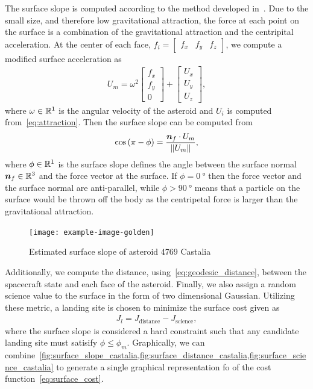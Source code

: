 The surface slope is computed according to the method developed in~\cite{scheeres1996}.
Due to the small size, and therefore low gravitational attraction, the force at each point on the surface is a combination of the gravitational attraction and the centripital acceleration.
At the center of each face, \( f_i = \begin{bmatrix} f_x & f_y & f_z \end{bmatrix} \), we compute a modified surface acceleration as
\begin{align}\label{eq:surface_force}
    U_m = \omega^2 \begin{bmatrix} f_x \\ f_y \\ 0 \end{bmatrix} + \begin{bmatrix} U_x \\ U_y \\ U_z \end{bmatrix},
\end{align}
where \( \omega \in \mathbb{R}^1 \) is the angular velocity of the asteroid and \( U_i \) is computed from~\cref{eq:attraction}.
Then the surface slope can be computed from
\begin{align}\label{eq:surface_slope}
    \cos \left(  \pi - \phi  \right) = \frac{\bm{n}_f \cdot U_m}{\left\| U_m \right\|},
\end{align}
where \( \phi \in \mathbb{R}^1 \) is the surface slope defines the angle between the surface normal \( \bm{n}_f \in \mathbb{R}^3 \) and the force vector at the surface.
If \( \phi = \SI{0}{\degree} \) then the force vector and the surface normal are anti-parallel, while \( \phi > \SI{90}{\degree} \) means that a particle on the surface would be thrown off the body as the centripetal force is larger than the gravitational attraction.
\begin{figure}[htbp]
    \centering
    \texttt{[image: example-image-golden]}
    \caption[Estimate Surface slope of 4769 Castalia]{Estimated surface slope of asteroid 4769 Castalia~\label{fig:surface_slope_castalia}}
\end{figure}
Additionally, we compute the distance, using~\cref{eq:geodesic_distance}, between the spacecraft state and each face of the asteroid. 
Finally, we also assign a random science value to the surface in the form of two dimensional Gaussian.
Utilizing these metric, a landing site is chosen to minimize the surface cost given as
\begin{align}\label{eq:surface_cost}
    J_l =  J_{\text{distance}} - J_{\text{science}},
\end{align}
where the surface slope is considered a hard constraint such that any candidate landing site must satisify \( \phi \leq \phi_m \).
Graphically, we can combine~\cref{fig:surface_slope_castalia,fig:surface_distance_castalia,fig:surface_science_castalia} to generate a single graphical representation fo of the cost function~\cref{eq:surface_cost}.

